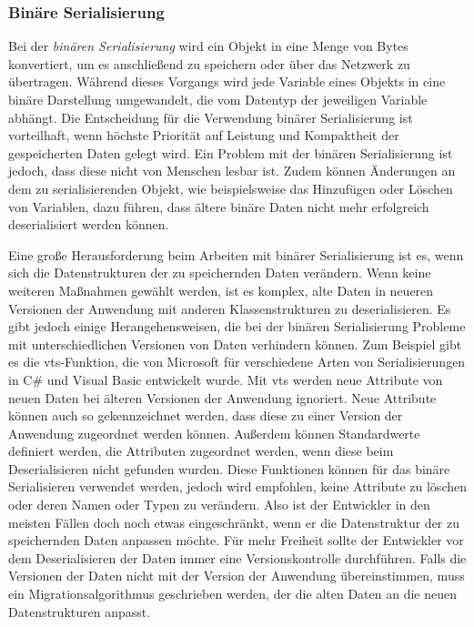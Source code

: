 \subsubsection{Binäre Serialisierung} \label{sssec:binSerialisierung}
Bei der \textit{binären Serialisierung} wird ein Objekt in eine Menge von Bytes konvertiert, um es anschließend zu speichern oder über das Netzwerk zu übertragen. Während dieses Vorgangs wird jede Variable eines Objekts in eine binäre Darstellung umgewandelt, die vom Datentyp der jeweiligen Variable abhängt. Die Entscheidung für die Verwendung binärer Serialisierung ist vorteilhaft, wenn höchste Priorität auf Leistung und Kompaktheit der gespeicherten Daten gelegt wird. Ein Problem mit der binären Serialisierung ist jedoch, dass diese nicht von Menschen lesbar ist. Zudem können Änderungen an dem zu serialisierenden Objekt, wie beispielsweise das Hinzufügen oder Löschen von Variablen, dazu führen, dass ältere binäre Daten nicht mehr erfolgreich deserialisiert werden können.\cite{microsoftBinarySerialization}\cite{programmathicallyUnderstandingBinary}

Eine große Herausforderung beim Arbeiten mit binärer Serialisierung ist es, wenn sich die Datenstrukturen der zu speichernden Daten verändern. Wenn keine weiteren Maßnahmen gewählt werden, ist es komplex, alte Daten in neueren Versionen der Anwendung mit anderen Klassenstrukturen zu deserialisieren. Es gibt jedoch einige Herangehensweisen, die bei der binären Serialisierung Probleme mit unterschiedlichen Versionen von Daten verhindern können. Zum Beispiel gibt es die \ac{vts}-Funktion, die von Microsoft für verschiedene Arten von Serialisierungen in C\# und Visual Basic entwickelt wurde. Mit \ac{vts} werden neue Attribute von neuen Daten bei älteren Versionen der Anwendung ignoriert. Neue Attribute können auch so gekennzeichnet werden, dass diese zu einer Version der Anwendung zugeordnet werden können. Außerdem können Standardwerte definiert werden, die Attributen zugeordnet werden, wenn diese beim Deserialisieren nicht gefunden wurden. Diese Funktionen können für das binäre Serialisieren verwendet werden, jedoch wird empfohlen, keine Attribute zu löschen oder deren Namen oder Typen zu verändern.\cite{microsoftVersiontolerantBinary} Also ist der Entwickler in den meisten Fällen doch noch etwas eingeschränkt, wenn er die Datenstruktur der zu speichernden Daten anpassen möchte. Für mehr Freiheit sollte der Entwickler vor dem Deserialisieren der Daten immer eine Versionskontrolle durchführen. Falls die Versionen der Daten nicht mit der Version der Anwendung übereinstimmen, muss ein Migrationsalgorithmus geschrieben werden, der die alten Daten an die neuen Datenstrukturen anpasst.

